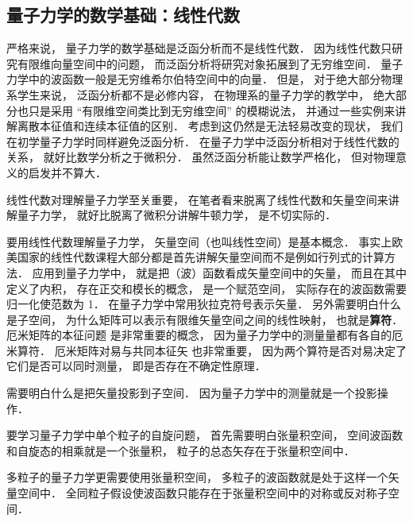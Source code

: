 
\begin{issues}
\issueTODO
\end{issues}

\subsection{量子力学的数学基础：线性代数}
严格来说， 量子力学的数学基础是泛函分析而不是线性代数． 因为线性代数只研究有限维向量空间中的问题， 而泛函分析将研究对象拓展到了无穷维空间． 量子力学中的波函数一般是无穷维希尔伯特空间中的向量． 但是， 对于绝大部分物理系学生来说， 泛函分析都不是必修内容， 在物理系的量子力学的教学中， 绝大部分也只是采用 “有限维空间类比到无穷维空间” 的模糊说法， 并通过一些实例来讲解离散本征值和连续本征值的区别． 考虑到这仍然是无法轻易改变的现状， 我们在初学量子力学时同样避免泛函分析． 在量子力学中泛函分析相对于线性代数的关系， 就好比数学分析之于微积分． 虽然泛函分析能让数学严格化， 但对物理意义的启发并不算大．

线性代数对理解量子力学至关重要， 在笔者看来脱离了线性代数和矢量空间来讲解量子力学， 就好比脱离了微积分讲解牛顿力学， 是不切实际的． 

要用线性代数理解量子力学， 矢量空间（也叫线性空间）是基本概念． 事实上欧美国家的线性代数课程大部分都是首先讲解矢量空间而不是例如行列式的计算方法． 应用到量子力学中， 就是把（波）函数看成矢量空间中的矢量， 而且在其中定义了内积， 存在正交和模长的概念， 是一个赋范空间， 实际存在的波函数需要归一化使范数为 1． 在量子力学中常用狄拉克符号表示矢量． 另外需要明白什么是子空间， 为什么矩阵可以表示有限维矢量空间之间的线性映射， 也就是\textbf{算符}． 厄米矩阵的本征问题 是非常重要的概念， 因为量子力学中的测量量都有各自的厄米算符． 厄米矩阵对易与共同本征矢 也非常重要， 因为两个算符是否对易决定了它们是否可以同时测量， 即是否存在不确定性原理．

需要明白什么是把矢量投影到子空间． 因为量子力学中的测量就是一个投影操作．

要学习量子力学中单个粒子的自旋问题， 首先需要明白张量积空间， 空间波函数和自旋态的相乘就是一个张量积， 粒子的总态矢存在于张量积空间中．

多粒子的量子力学更需要使用张量积空间， 多粒子的波函数就是处于这样一个矢量空间中． 全同粒子假设使波函数只能存在于张量积空间中的对称或反对称子空间．

